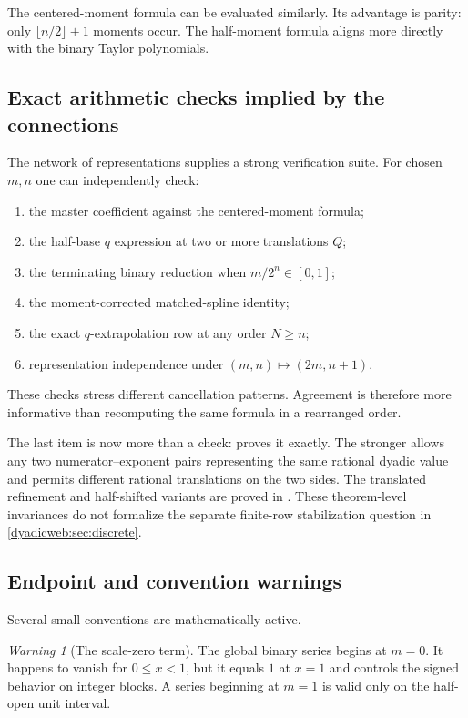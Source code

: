 \documentclass[11pt,oneside]{article}
\theoremstyle{definition}
\theoremstyle{remark}
\newtheorem{warning}[warning]{Warning}
\begin{document}
The centered-moment formula can be evaluated similarly.  Its advantage is parity: only
$\lfloor n/2\rfloor+1$ moments occur.  The half-moment formula aligns more directly with the
binary Taylor polynomials.

\subsection{Exact arithmetic checks implied by the connections}

The network of representations supplies a strong verification suite.  For chosen $m,n$ one
can independently check:
\begin{enumerate}
\item the master coefficient against the centered-moment formula;
\item the half-base $q$ expression at two or more translations $Q$;
\item the terminating binary reduction when $m/2^n\in[0,1]$;
\item the moment-corrected matched-spline identity;
\item the exact $q$-extrapolation row at any order $N\ge n$;
\item representation independence under $(m,n)\mapsto(2m,n+1)$.
\end{enumerate}
These checks stress different cancellation patterns.  Agreement is therefore more informative
than recomputing the same formula in a rearranged order.

The last item is now more than a check: 
proves it exactly.  The stronger
 allows any two
numerator--exponent pairs representing the same rational dyadic value and permits different
rational translations on the two sides.  The translated refinement and half-shifted variants
are proved in .  These theorem-level invariances do not
formalize the separate finite-row stabilization question in \cref{dyadicweb:sec:discrete}.

\subsection{Endpoint and convention warnings}

Several small conventions are mathematically active.

\begin{warning}[The scale-zero term]
The global binary series begins at $m=0$.  It happens to vanish for $0\le x<1$, but it equals
$1$ at $x=1$ and controls the signed behavior on integer blocks.  A series beginning at
$m=1$ is valid only on the half-open unit interval.
\end{warning}
\end{document}
